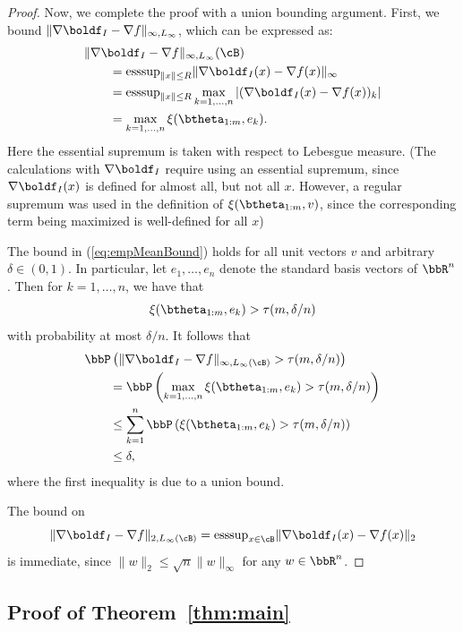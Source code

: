 \documentclass[letterpaper, 10 pt, conference]{ieeeconf}  %
\begin{document}
\begin{proof}
Now, we complete the proof with a union bounding argument. First, we bound $\|\nabla \boldf_I-\nabla f\|_{\infty,L_{\infty}}$, which can be expressed as:
\begin{align*}
  \MoveEqLeft
  \|\nabla \boldf_I - \nabla f\|_{\infty,L_{\infty}}(\cB)\\
  &=\mathrm{esssup}_{\|x\|\le R} \|\nabla \boldf_I(x)-\nabla f(x)\|_{\infty} \\
                                                    &=\mathrm{esssup}_{\|x\|\le R}\max_{k=1,\ldots,n} \left|(\nabla \boldf_I(x)-\nabla f(x))_k \right| \\
                                                    &=\max_{k=1,\ldots,n}\xi(\btheta_{1:m},e_k).
\end{align*}
Here the  essential supremum is taken with respect to Lebesgue measure. (The calculations with $\nabla \boldf_I$ require using an essential supremum, since $\nabla \boldf_I(x)$ is defined for almost all, but not all $x$. However, a regular supremum was used in the definition of $\xi(\btheta_{1:m},v)$, since the corresponding term being maximized is well-defined for  all $x$)



The bound in (\ref{eq:empMeanBound}) holds for all unit vectors $v$ and arbitrary $\delta \in (0,1)$. In particular, let $e_1,\ldots,e_n$ denote the standard basis vectors of $\bbR^n$. Then for $k=1,\ldots,n$, we have that
$$
\xi(\btheta_{1:m},e_k)> \tau(m,\delta/n)
$$
with probability at most $\delta/n$. It follows that
\begin{align*}
  \MoveEqLeft
  \bbP\left(
  \|\nabla \boldf_I-\nabla f\|_{\infty,L_{\infty}(\cB)} > \tau(m,\delta/n)
  \right) \\
  &=
    \bbP\left(
   \max_{k=1,\ldots,n} \xi(\btheta_{1:m},e_k)> \tau(m,\delta/n)
    \right) \\
  &\le \sum_{k=1}^n \bbP\left(
    \xi(\btheta_{1:m},e_k)> \tau(m,\delta/n)
    \right) \\
  &\le \delta,
\end{align*}
where the first inequality is due to a union bound. 

The bound on
$$
\|\nabla \boldf_I-\nabla f\|_{2,L_{\infty}(\cB)}=\mathrm{esssup}_{x\in\cB}\|\nabla \boldf_I(x)-\nabla f(x)\|_2
$$
is immediate, since $\|w\|_2\le \sqrt{n}\|w\|_{\infty}$ for any $w\in\bbR^n$. 
\end{proof}

\subsection{Proof of Theorem~\ref{thm:main}}
\label{ss:pf}
\end{document}
